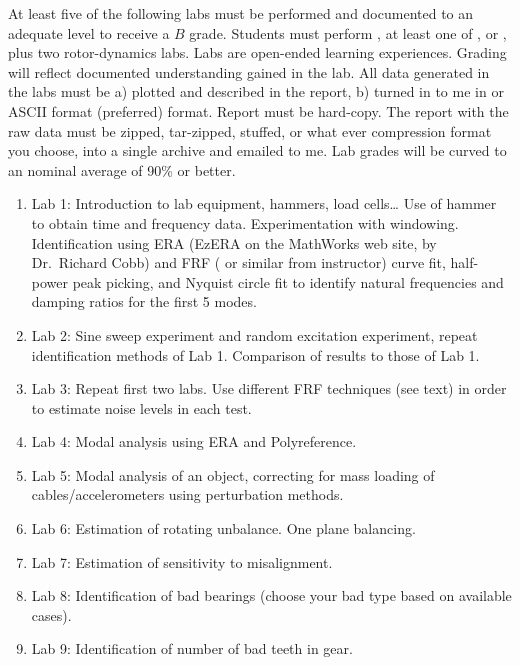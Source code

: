 \documentclass[letterpaper,10pt,english]{sphinxmanual}
\begin{document}
At least five of the following labs must be performed and documented to
an adequate level to receive a \(B\) grade. Students must perform
{\hyperref[\detokenize{classes/ME7690Syll:lab-1}]{}}, at least one of {\hyperref[\detokenize{classes/ME7690Syll:lab-2}]{}}, {\hyperref[\detokenize{classes/ME7690Syll:lab-3}]{}} or {\hyperref[\detokenize{classes/ME7690Syll:lab-4}]{}}, plus two
rotor-dynamics labs. Labs are open-ended learning experiences. Grading
will reflect documented understanding gained in the lab. All data
generated in the labs must be a) plotted and described in the report, b)
turned in to me in  or ASCII format (preferred) format. Report must
be hard-copy. The report with the raw data must be zipped, tar-zipped,
stuffed, or what ever compression format you choose, into a single
archive and emailed to me. Lab grades will be curved to an nominal
average of 90\% or better.
\label{\detokenize{classes/ME7690Syll:lab-1}}\begin{enumerate}
\item {} 
Lab 1: Introduction to lab equipment, hammers, load cells… Use of
hammer to obtain time and frequency data. Experimentation with
windowing. Identification using ERA (EzERA on the MathWorks web site,
by Dr. Richard Cobb) and FRF ( or similar from instructor) curve fit, half-power peak picking, and Nyquist circle fit to identify natural frequencies and damping ratios for the first 5 modes.


\item {} 
Lab 2: Sine sweep experiment and random excitation experiment, repeat
identification methods of Lab 1. Comparison of results to those of
Lab 1.


\item {} 
Lab 3: Repeat first two labs. Use different FRF techniques (see text)
in order to estimate noise levels in each test.


\item {} 
Lab 4: Modal analysis using ERA and Polyreference.

\item {} 
Lab 5: Modal analysis of an object, correcting for mass loading of
cables/accelerometers using perturbation methods.

\item {} 
Lab 6: Estimation of rotating unbalance. One plane balancing.

\item {} 
Lab 7: Estimation of sensitivity to misalignment.

\item {} 
Lab 8: Identification of bad bearings (choose your bad type based on
available cases).

\item {} 
Lab 9: Identification of number of bad teeth in gear.

\end{enumerate}
\end{document}

